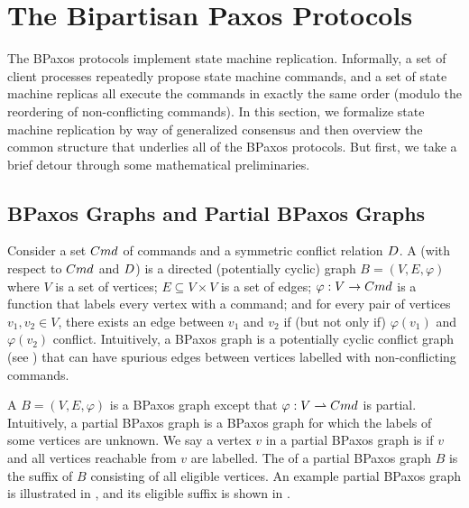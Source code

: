 \section{The Bipartisan Paxos Protocols}
The BPaxos protocols implement state machine replication. Informally, a set of
client processes repeatedly propose state machine commands, and a set of state
machine replicas all execute the commands in exactly the same order (modulo the
reordering of non-conflicting commands). In this section, we formalize state
machine replication by way of generalized consensus and then overview the
common structure that underlies all of the BPaxos protocols. But first, we take
a brief detour through some mathematical preliminaries.

\subsection{BPaxos Graphs and Partial BPaxos Graphs}
Consider a set $Cmd$ of commands and a symmetric conflict relation
$D$. A  (with respect to $Cmd$ and $D$)
is a directed (potentially cyclic) graph $B = (V, E, \varphi)$ where
%
  $V$ is a set of vertices;
%
  $E \subseteq V \times V$ is a set of edges;
%
  $\varphi: V \to Cmd$ is a function that labels every vertex with a command;
  and
%
  for every pair of vertices $v_1, v_2 \in V$, there exists an edge between
  $v_1$ and $v_2$ if (but not only if) $\varphi(v_1)$ and $\varphi(v_2)$
  conflict.
%
Intuitively, a BPaxos graph is a potentially cyclic conflict graph (see
) that can have spurious edges between vertices labelled
with non-conflicting commands.

A  $B = (V, E, \varphi)$ is a BPaxos graph except
that $\varphi: V \rightharpoonup Cmd$ is partial. Intuitively, a partial BPaxos
graph is a BPaxos graph for which the labels of some vertices are unknown.
%
We say a vertex $v$ in a partial BPaxos graph is  if $v$ and
all vertices reachable from $v$ are labelled. The  of
a partial BPaxos graph $B$ is the suffix of $B$ consisting of all eligible
vertices.
%
An example partial BPaxos graph is illustrated in ,
and its eligible suffix is shown in .



